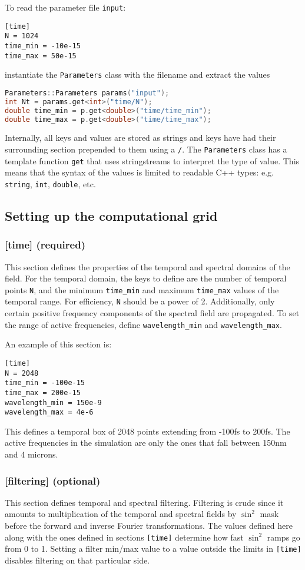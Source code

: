 \documentclass{article}
\begin{document}
To read the parameter file \texttt{input}:
\begin{lstlisting}
[time]
N = 1024
time_min = -10e-15
time_max = 50e-15
\end{lstlisting}
instantiate the \texttt{Parameters} class with the filename and
extract the values
\begin{lstlisting}[language=C++]
Parameters::Parameters params("input");
int Nt = params.get<int>("time/N");
double time_min = p.get<double>("time/time_min");
double time_max = p.get<double>("time/time_max");
\end{lstlisting}

Internally, all keys and values are stored as strings and keys have
had their surrounding section prepended to them using a \texttt{/}.
The \texttt{Parameters} class has a template function \texttt{get}
that uses stringstreams to interpret the type of value. This means
that the syntax of the values is limited to readable C++ types:
e.g. \texttt{string}, \texttt{int}, \texttt{double}, etc.


\subsection{Setting up the computational grid}
\subsubsection{[time] (required)}
This section defines the properties of the temporal and spectral
domains of the field. For the temporal domain, the keys to define are
the number of temporal points \texttt{N}, and the minimum
\texttt{time\_min} and maximum \texttt{time\_max} values of the
temporal range.  For efficiency, \texttt{N} should be a power of
2. Additionally, only certain positive frequency components of the
spectral field are propagated. To set the range of active frequencies,
define \texttt{wavelength\_min} and \texttt{wavelength\_max}.

An example of this section is:
\begin{lstlisting}
[time]
N = 2048
time_min = -100e-15
time_max = 200e-15
wavelength_min = 150e-9
wavelength_max = 4e-6
\end{lstlisting}

This defines a temporal box of 2048 points extending from -100fs to
200fs. The active frequencies in the simulation are only the ones that
fall between 150nm and 4 microns.

\subsubsection{[filtering] (optional)}
This section defines temporal and spectral filtering. Filtering is
crude since it amounts to multiplication of the temporal and spectral
fields by $\sin^2$ mask before the forward and inverse Fourier
transformations.  The values defined here along with the ones defined
in sections \texttt{[time]} determine how fast $\sin^2$ ramps go from
0 to 1. Setting a filter min/max value to a value outside the limits
in \texttt{[time]} disables filtering on that particular side.
\end{document}
